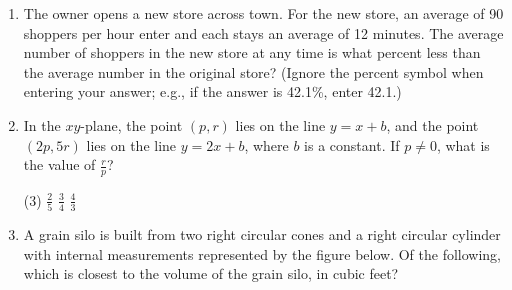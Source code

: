 \begin{enumerate}[leftmargin=*, label=\textbf{\arabic*.}, resume]
  \item The owner opens a new store across town. For the new store, an average of 90 shoppers per hour enter and each stays an average of 12 minutes. The average number of shoppers in the new store at any time is what percent less than the average number in the original store? (Ignore the percent symbol when entering your answer; e.g., if the answer is 42.1\%, enter 42.1.)
  \vspace{4cm}



  \newpage

  \item In the $xy$-plane, the point $(p, r)$ lies on the line $y = x + b$, and the point $(2p, 5r)$ lies on the line $y = 2x + b$, where $b$ is a constant. If $p \neq 0$, what is the value of $\frac{r}{p}$?

  \begin{tasks}(3)
    \task $\frac{2}{5}$
    \task $\frac{3}{4}$
    \task $\frac{4}{3}$
  \end{tasks}
  \vspace{4cm}

  \item A grain silo is built from two right circular cones and a right circular cylinder with internal measurements represented by the figure below. Of the following, which is closest to the volume of the grain silo, in cubic feet?
  \begin{center}
  \end{center}


\end{enumerate}
